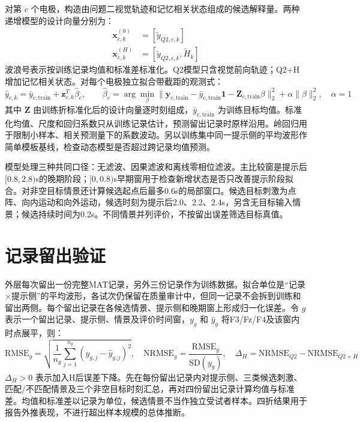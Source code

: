 \documentclass[UTF8,a4paper,12pt]{ctexart}
\begin{document}
对第 \(c\) 个电极，构造由问题二视觉轨迹和记忆相关状态组成的候选解释量。两种递增模型的设计向量分别为：
\begin{equation}
\begin{aligned}
\mathbf{x}_{c,k}^{(0)} &= [\tilde{y}_{Q2,c,k}] \\
\mathbf{x}_{c,k}^{(H)} &= [\tilde{y}_{Q2,c,k}, \tilde{H}_k]
\end{aligned}
\end{equation}
波浪号表示按训练记录均值和标准差标准化。Q2模型只含视觉前向轨迹；Q2+H增加记忆相关状态。对每个电极独立拟合带截距的观测式：
\begin{equation}
\hat{y}_{c,k} = \bar{y}_{c,\text{train}} + \mathbf{z}_{c,k}^T \hat{\beta}_c, \qquad \hat{\beta}_c = \arg\min_\beta \|\mathbf{y}_{c,\text{train}} - \bar{y}_{c,\text{train}}\mathbf{1} - \mathbf{Z}_{c,\text{train}}\beta\|_2^2 + \alpha\|\beta\|_2^2, \quad \alpha=1
\end{equation}
其中 \(\mathbf{Z}\) 由训练折标准化后的设计向量逐时刻组成，\(\bar{y}_{c,\text{train}}\) 为训练目标均值。标准化均值、尺度和回归系数只从训练记录估计，预测留出记录时原样沿用。岭回归用于限制小样本、相关预测量下的系数波动。另以训练集中同一提示侧的平均波形作简单模板基线，检查动态模型是否超过跨记录均值预测。

模型处理三种共同口径：无滤波、因果滤波和离线零相位滤波。主比较窗是提示后$[0.8, 2.8)$s的晚期阶段；$[0, 0.8)$s早期窗用于检查新增状态是否只改善提示阶段拟合。对非空目标情景还计算候选起点后最多0.6s的局部窗口。候选目标刺激为点阵、向内运动和向外运动，候选时刻为提示后2.0、2.2、2.4s，另含无目标输入情景；候选持续时间为0.2s。不同情景并列评价，不按留出误差筛选目标真值。

\section{记录留出验证}

外层每次留出一份完整MAT记录，另外三份记录作为训练数据。拟合单位是“记录$\times$提示侧”的平均波形，各试次仍保留在质量审计中，但同一记录不会拆到训练和留出两侧。每个留出记录在各候选情景、提示侧和晚期窗上形成归一化误差。令 \(g\) 表示一个留出记录、提示侧、情景及评价时间窗，\(y_g\) 和 \(\hat{y}_g\) 将F3/Fz/F4及该窗内时点展平，则：
\begin{equation}
\text{RMSE}_g = \sqrt{\frac{1}{n_g}\sum_{j=1}^{n_g}(y_{g,j} - \hat{y}_{g,j})^2}, \quad \text{NRMSE}_g = \frac{\text{RMSE}_g}{\text{SD}(y_g)}, \quad \Delta_H = \text{NRMSE}_{Q2} - \text{NRMSE}_{Q2+H}
\end{equation}
\(\Delta_H > 0\) 表示加入H后误差下降。先在每份留出记录内对提示侧、三类候选刺激、匹配/不匹配情景及三个非空目标时刻汇总，再对四份留出记录计算均值与标准差。均值和标准差以记录为单位，候选情景不当作独立受试者样本。四折结果用于报告外推表现，不进行超出样本规模的总体推断。
\end{document}
